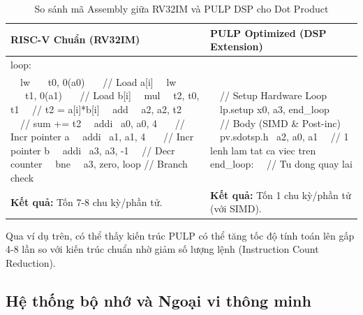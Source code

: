 \begin{table}[h]
\centering
\begin{tabular}{|p{7cm}|p{7cm}|}
\hline
\textbf{RISC-V Chuẩn (RV32IM)} & \textbf{PULP Optimized (DSP Extension)} \\ \hline
\ttfamily
\small
loop: \\
\ \ lw \ \ \ t0, 0(a0) \ \ \ // Load a[i] \newline
\ \ lw \ \ \ t1, 0(a1) \ \ \ // Load b[i] \newline
\ \ mul \ \ t2, t0, t1 \ \ // t2 = a[i]*b[i] \newline
\ \ add \ \ a2, a2, t2 \ \ // sum += t2 \newline
\ \ addi \ a0, a0, 4 \ \ \ // Incr pointer a \newline
\ \ addi \ a1, a1, 4 \ \ \ // Incr pointer b \newline
\ \ addi \ a3, a3, -1 \ \ // Decr counter \newline
\ \ bne \ \ a3, zero, loop // Branch check
& 
\ttfamily
\small
\ \ // Setup Hardware Loop \newline
\ \ lp.setup x0, a3, end\_loop \newline
\ \ \newline
\ \ // Body (SIMD \& Post-inc) \newline
\ \ pv.sdotsp.h \ a2, a0, a1 \newline
\ \ // 1 lenh lam tat ca viec tren \newline
\ \ \newline
end\_loop: \newline
\ \ // Tu dong quay lai
\\ \hline
\textbf{Kết quả:} Tốn 7-8 chu kỳ/phần tử. & \textbf{Kết quả:} Tốn 1 chu kỳ/phần tử (với SIMD). \\ \hline
\end{tabular}
\caption{So sánh mã Assembly giữa RV32IM và PULP DSP cho Dot Product}
\end{table}

Qua ví dụ trên, có thể thấy kiến trúc PULP có thể tăng tốc độ tính toán 
lên gấp 4-8 lần so với kiến trúc chuẩn nhờ giảm số lượng lệnh (Instruction Count Reduction).

\subsection{Hệ thống bộ nhớ và Ngoại vi thông minh}

